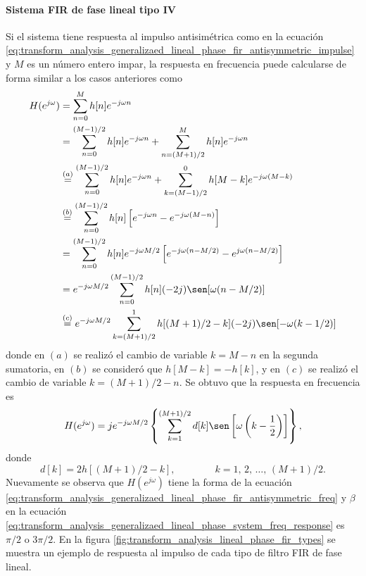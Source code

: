 \documentclass[a4paper]{report}
\begin{document}
\paragraph{Sistema FIR de fase lineal tipo IV} Si el sistema tiene respuesta al impulso antisimétrica como en la ecuación \ref{eq:transform_analysis_generalizaed_lineal_phase_fir_antisymmetric_impulse}
y \(M\) es un número entero impar, la respuesta en frecuencia puede calcularse de forma similar a los casos anteriores como
\begin{align*}
 H(e^{j\omega})&=\sum_{n=0}^M h[n]e^{-j\omega n}\\
  &=\sum_{n=0}^{(M-1)/2}h[n]e^{-j\omega n}+\sum_{n=(M+1)/2}^Mh[n]e^{-j\omega n}\\
  &\overset{(a)}{=}\sum_{n=0}^{(M-1)/2}h[n]e^{-j\omega n}+\sum_{k=(M-1)/2}^0h[M-k]e^{-j\omega(M-k)}\\
  &\overset{(b)}{=}\sum_{n=0}^{(M-1)/2}h[n]\left[e^{-j\omega n}-e^{-j\omega(M-n)}\right]\\
  &=\sum_{n=0}^{(M-1)/2}h[n]e^{-j\omega M/2}\left[e^{-j\omega(n-M/2)}-e^{j\omega(n-M/2)}\right]\\
  &=e^{-j\omega M/2}\sum_{n=0}^{(M-1)/2}h[n](-2j)\sen[\omega(n-M/2)]\\
  &\overset{(c)}{=}e^{-j\omega M/2}\sum_{k=(M+1)/2}^1h[(M+1)/2-k](-2j)\sen[-\omega(k-1/2)]
\end{align*}
donde en \((a)\) se realizó el cambio de variable \(k=M-n\) en la segunda sumatoria, en \((b)\) se consideró que \(h[M-k]=-h[k]\), y en \((c)\) se realizó el cambio de variable \(k=(M+1)/2-n\). Se obtuvo que la respuesta en frecuencia es
\begin{equation}\label{eq:transform_analysis_generalizaed_lineal_phase_fir_type_IV_freq_resp}
 H(e^{j\omega})=je^{-j\omega M/2}\left\{\sum_{k=1}^{(M+1)/2}d[k]\sen\left[\omega\left(k-\frac{1}{2}\right)\right]\right\}, 
\end{equation}
donde
\[
 d[k]=2h[(M+1)/2-k],
 \qquad\qquad 
 k=1,\,2,\,\dots,\,(M+1)/2.
\]
Nuevamente se observa que \(H(e^{j\omega})\) tiene la forma de la ecuación \ref{eq:transform_analysis_generalizaed_lineal_phase_fir_antisymmetric_freq} y \(\beta\) en la ecuación \ref{eq:transform_analysis_generalizaed_lineal_phase_system_freq_response} es \(\pi/2\) o \(3\pi/2\). En la figura \ref{fig:transform_analysis_lineal_phase_fir_types} se muestra un ejemplo de respuesta al impulso de cada tipo de filtro FIR de fase lineal.
\end{document}
